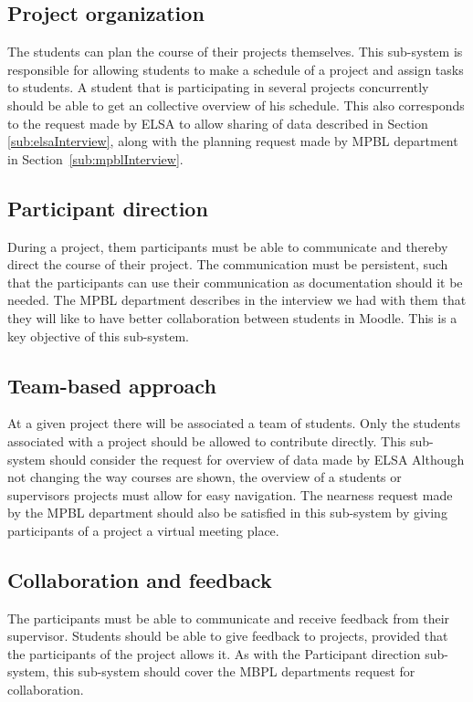\subsection{Project organization} %
The students can plan the course of their projects themselves.
This sub-system is responsible for allowing students to make a schedule of a project and assign tasks to students.
A student that is participating in several projects concurrently should be able to get an collective overview of his schedule.
This also corresponds to the request made by ELSA to allow sharing of data described in Section \ref{sub:elsaInterview}, along with the planning request made by MPBL department in Section~\ref{sub:mpblInterview}.

\subsection{Participant direction} %
During a project, them participants must be able to communicate and thereby direct the course of their project.
The communication must be persistent, such that the participants can use their communication as documentation should it be needed.
The MPBL department describes in the interview we had with them that they will like to have better collaboration between students in Moodle.
This is a key objective of this sub-system.

\subsection{Team-based approach} %
At a given project there will be associated a team of students.
Only the students associated with a project should be allowed to contribute directly.
This sub-system should consider the request for overview of data made by ELSA
Although not changing the way courses are shown, the overview of a students or supervisors projects must allow for easy navigation.
The nearness request made by the MPBL department should also be satisfied in this sub-system by giving participants of a project a virtual meeting place.

\subsection{Collaboration and feedback} %
The participants must be able to communicate and receive feedback from their supervisor.
Students should be able to give feedback to projects, provided that the participants of the project allows it.
As with the Participant direction sub-system, this sub-system should cover the MBPL departments request for collaboration.



